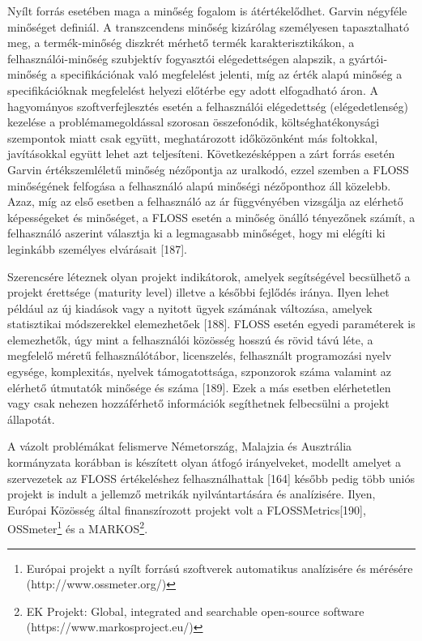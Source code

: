 \documentclass[12pt,magyar,a4paper,oneside]{scrreprt}
\begin{document}
Nyílt forrás esetében maga a minőség fogalom is átértékelődhet. Garvin
négyféle minőséget definiál. A transzcendens minőség kizárólag
személyesen tapasztalható meg, a termék-minőség diszkrét mérhető termék
karakterisztikákon, a felhasználói-minőség szubjektív fogyasztói
elégedettségen alapszik, a gyártói-minőség a specifikációnak való
megfelelést jelenti, míg az érték alapú minőség a specifikációknak
megfelelést helyezi előtérbe egy adott elfogadható áron. A hagyományos
szoftverfejlesztés esetén a felhasználói elégedettség (elégedetlenség)
kezelése a problémamegoldással szorosan összefonódik,
költséghatékonysági szempontok miatt csak együtt, meghatározott
időközönként más foltokkal, javításokkal együtt lehet azt teljesíteni.
Következésképpen a zárt forrás esetén Garvin értékszemléletű minőség
nézőpontja az uralkodó, ezzel szemben a FLOSS minőségének felfogása a
felhasználó alapú minőségi nézőponthoz áll közelebb. Azaz, míg az első
esetben a felhasználó az ár függvényében vizsgálja az elérhető
képességeket és minőséget, a FLOSS esetén a minőség önálló tényezőnek
számít, a felhasználó aszerint választja ki a legmagasabb minőséget,
hogy mi elégíti ki leginkább személyes elvárásait {[}187{]}.

Szerencsére léteznek olyan projekt indikátorok, amelyek segítségével
becsülhető a projekt érettsége (maturity level) illetve a későbbi
fejlődés iránya. Ilyen lehet például az új kiadások vagy a nyitott ügyek
számának változása, amelyek statisztikai módszerekkel elemezhetőek
{[}188{]}. FLOSS esetén egyedi paraméterek is elemezhetők, úgy mint a
felhasználói közösség hosszú és rövid távú léte, a megfelelő méretű
felhasználótábor, licenszelés, felhasznált programozási nyelv egysége,
komplexitás, nyelvek támogatottsága, szponzorok száma valamint az
elérhető útmutatók minősége és száma {[}189{]}. Ezek a más esetben
elérhetetlen vagy csak nehezen hozzáférhető információk segíthetnek
felbecsülni a projekt állapotát.

A vázolt problémákat felismerve Németország, Malajzia és Ausztrália
kormányzata korábban is készített olyan átfogó irányelveket, modellt
amelyet a szervezetek az FLOSS értékeléshez felhasználhattak {[}164{]}
később pedig több uniós projekt is indult a jellemző metrikák
nyilvántartására és analízisére. Ilyen, Európai Közösség által
finanszírozott projekt volt a FLOSSMetrics{[}190{]}, OSSmeter\footnote{Európai
  projekt a nyílt forrású szoftverek automatikus analízisére és mérésére
  (http://www.ossmeter.org/)} és a MARKOS\footnote{EK Projekt: Global,
  integrated and searchable open-source software
  (https://www.markosproject.eu/)}.
\end{document}
